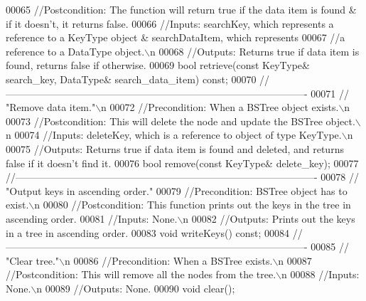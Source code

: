 \begin{DoxyCode}
00065     \textcolor{comment}{//Postcondition: The function will return true if the data item is found & if it doesn't, it returns
       false.}
00066     \textcolor{comment}{//Inputs: searchKey, which represents a reference to a KeyType object & searchDataItem, which
       represents}
00067     \textcolor{comment}{//a reference to a DataType object.\(\backslash\)n}
00068     \textcolor{comment}{//Outputs: Returns true if data item is found, returns false if otherwise.}
00069     \textcolor{keywordtype}{bool} retrieve(\textcolor{keyword}{const} KeyType& search\_key, DataType& search\_data\_item) \textcolor{keyword}{const};
00070     \textcolor{comment}{//-------------------------------------------------------------------------------------------}
00071     \textcolor{comment}{// "Remove data item."\(\backslash\)n}
00072     \textcolor{comment}{//Precondition: When a BSTree object exists.\(\backslash\)n}
00073     \textcolor{comment}{//Postcondition: This will delete the node and update the BSTree object.\(\backslash\)n}
00074     \textcolor{comment}{//Inputs: deleteKey, which is a reference to object of type KeyType.\(\backslash\)n}
00075     \textcolor{comment}{//Outputs: Returns true if data item is found and deleted, and returns false if it doesn't find it.}
00076     \textcolor{keywordtype}{bool} \textcolor{keyword}{remove}(\textcolor{keyword}{const} KeyType& delete\_key);
00077     \textcolor{comment}{//-------------------------------------------------------------------------------------------}
00078     \textcolor{comment}{// "Output keys in ascending order."}
00079     \textcolor{comment}{//Precondition: BSTree object has to exist.\(\backslash\)n}
00080     \textcolor{comment}{//Postcondition: This function prints out the keys in the tree in ascending order.}
00081     \textcolor{comment}{//Inputs: None.\(\backslash\)n}
00082     \textcolor{comment}{//Outputs: Prints out the keys in a tree in ascending order.}
00083     \textcolor{keywordtype}{void} writeKeys() \textcolor{keyword}{const};   
00084     \textcolor{comment}{//-------------------------------------------------------------------------------------------}
00085     \textcolor{comment}{// "Clear tree."\(\backslash\)n}
00086     \textcolor{comment}{//Precondition: When a BSTree exists.\(\backslash\)n}
00087     \textcolor{comment}{//Postcondition: This will remove all the nodes from the tree.\(\backslash\)n}
00088     \textcolor{comment}{//Inputs: None.\(\backslash\)n}
00089     \textcolor{comment}{//Outputs: None.}
00090     \textcolor{keywordtype}{void} clear();                                

\end{DoxyCode}
